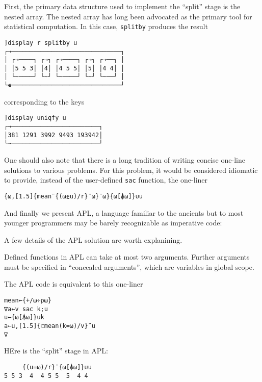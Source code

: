 \documentclass[11pt]{asaproc}
\begin{document}
First, the primary data structure used to implement the ``split'' stage is the nested array. The nested array has long been advocated as the primary tool for statistical computation\cite{Anscombe1981,Friendly1994}. In this case, \lstinline|splitby| produces the result

\begin{lstlisting}[language=apl]
]display r splitby u
┌→──────────────────────────────┐
│ ┌→────┐ ┌→┐ ┌→────┐ ┌→┐ ┌→──┐ │
│ │5 5 3│ │4│ │4 5 5│ │5│ │4 4│ │
│ └~────┘ └~┘ └~────┘ └~┘ └~──┘ │
└∊──────────────────────────────┘
\end{lstlisting}

corresponding to the keys

\begin{lstlisting}[language=apl]
]display uniqfy u
┌→────────────────────────┐
│381 1291 3992 9493 193942│
└~────────────────────────┘
\end{lstlisting}

One should also note that there is a long tradition of writing concise one-line solutions to various problems. For this problem, it would be considered idiomatic to provide, instead of the user-defined \lstinline|sac| function, the one-liner

\begin{lstlisting}[language=apl]
{⍵,[1.5]{mean¨{(⍵⍷u)/r}¨⍵}¨⍵}{⍵[⍋⍵]}∪u
\end{lstlisting}


And finally we present APL, a language familiar to the ancients but to most
younger programmers may be barely recognizable as imperative code:



A few details of the APL solution are worth explanining.

Defined functions in APL can take at most two arguments.
Further arguments must be specified in ``concealed arguments'', which are variables in global scope.

The APL code is equivalent to this one-liner

\begin{lstlisting}
mean←{+/⍵÷⍴⍵}
∇a←v sac k;u
u←{⍵[⍋⍵]}∪k
a←u,[1.5]{⊂mean(k=⍵)/v}¨u
∇
\end{lstlisting}

HEre is the ``split'' stage in APL:

\begin{lstlisting}
     {(u=⍵)/r}¨{⍵[⍋⍵]}∪u
5 5 3  4  4 5 5  5  4 4
\end{lstlisting}
\end{document}
